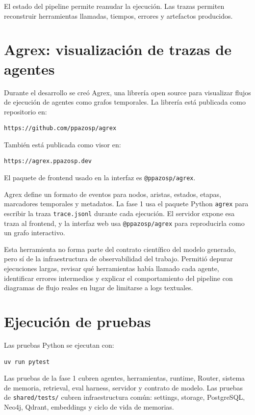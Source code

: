 El estado del pipeline permite reanudar la ejecución. Las trazas permiten
reconstruir herramientas llamadas, tiempos, errores y artefactos producidos.

\section{Agrex: visualización de trazas de agentes}
\label{ap:agrex}

Durante el desarrollo se creó Agrex, una librería open source para visualizar
flujos de ejecución de agentes como grafos temporales. La librería está
publicada como repositorio en:

\begin{verbatim}
https://github.com/ppazosp/agrex
\end{verbatim}

También está publicada como visor en:

\begin{verbatim}
https://agrex.ppazosp.dev
\end{verbatim}

El paquete de frontend usado en la interfaz es \texttt{@ppazosp/agrex}.

Agrex define un formato de eventos para nodos, aristas, estados, etapas,
marcadores temporales y metadatos. La fase 1 usa el paquete Python
\texttt{agrex} para escribir la traza \texttt{trace.jsonl} durante cada
ejecución. El servidor expone esa traza al frontend, y la interfaz web usa
\texttt{@ppazosp/agrex} para reproducirla como un grafo interactivo.

Esta herramienta no forma parte del contrato científico del modelo generado,
pero sí de la infraestructura de observabilidad del trabajo. Permitió depurar
ejecuciones largas, revisar qué herramientas había llamado cada agente,
identificar errores intermedios y explicar el comportamiento del pipeline con
diagramas de flujo reales en lugar de limitarse a logs textuales.

\section{Ejecución de pruebas}

Las pruebas Python se ejecutan con:

\begin{verbatim}
uv run pytest
\end{verbatim}

Las pruebas de la fase 1 cubren agentes, herramientas, runtime, Router, sistema
de memoria, retrieval, eval harness, servidor y contrato de modelo. Las pruebas
de \texttt{shared/tests/} cubren infraestructura común: settings, storage,
PostgreSQL, Neo4j, Qdrant, embeddings y ciclo de vida de memorias.

